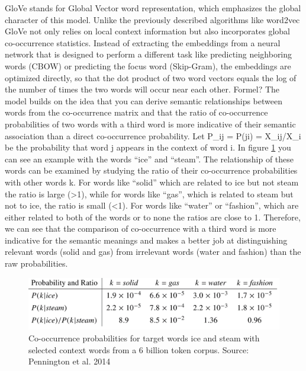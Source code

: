 \documentclass[]{krantz}
\begin{document}
GloVe stands for Global Vector word representation, which emphasizes the global character of this model. Unlike the previously described algorithms like word2vec GloVe not only relies on local context information but also incorporates global co-occurrence statistics. Instead of extracting the embeddings from a neural network that is designed to perform a different task like predicting neighboring words (CBOW) or predicting the focus word (Skip-Gram), the embeddings are optimized directly, so that the dot product of two word vectors equals the log of the number of times the two words will occur near each other. Formel? The model builds on the idea that you can derive semantic relationships between words from the co-occurrence matrix and that the ratio of co-occurrence probabilities of two words with a third word is more indicative of their semantic association than a direct co-occurrence probability.
Let P\_ij = P(j\textbar{}i) = X\_ij/X\_i be the probability that word j appears in the context of word i. In figure \ref{fig:glove} you can see an example with the words ``ice'' and ``steam''. The relationship of these words can be examined by studying the ratio of their co-occurrence probabilities with other words k.
For words like ``solid'' which are related to ice but not steam the ratio is large (\textgreater{}1), while for words like ``gas'', which is related to steam but not to ice, the ratio is small (\textless{}1). For words like ``water'' or ``fashion'', which are either related to both of the words or to none the ratios are close to 1. Therefore, we can see that the comparison of co-occurrence with a third word is more indicative for the semantic meanings and makes a better job at distinguishing relevant words (solid and gas) from irrelevant words (water and fashion) than the raw probabilities.

\begin{figure}
\includegraphics[width=\textwidth]{figures/01-01-foundations-applications-of-modern-NLP/01-01_glove_ratios} \caption{Co-occurrence probabilities for target words ice and steam with selected context words from a 6 billion token corpus.  Source: Pennington et al. 2014}\label{fig:glove}
\end{figure}
\end{document}
